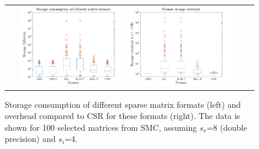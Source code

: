 \begin{figure}[p]
\begin{tabular}{cc}
    \includegraphics[width=0.45\textwidth]{plots/storage_consumption.pdf}
    \includegraphics[width=0.45\textwidth]{plots/storage_overhead.pdf} &
\end{tabular}
\caption[Storage consumption 
    of different sparse matrix formats
    and overhead compared to CSR]
    {Storage consumption 
    of different sparse matrix formats (left)
    and overhead compared to CSR for these formats (right).
    The data is shown for 100 selected matrices from SMC,
    assuming $s_v$=8 \linebreak (double precision) and $s_i$=4.}
\label{2017-csr-spmv:fig:storage}
\end{figure}

